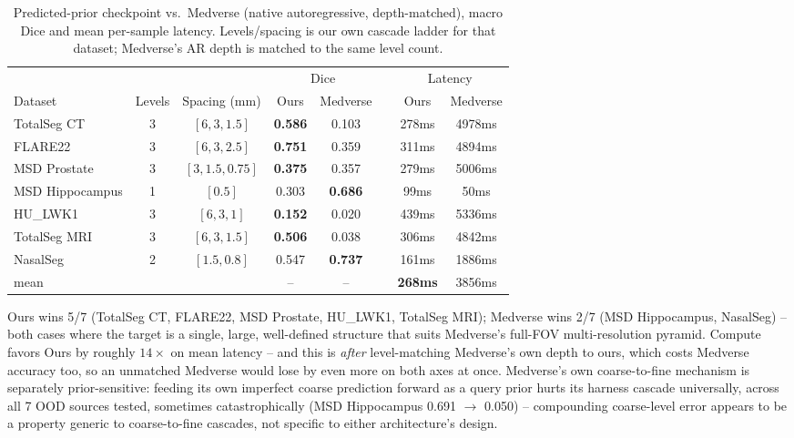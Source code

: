 \begin{table}[t]
  \centering
  \small
  \caption{Predicted-prior checkpoint vs.\ Medverse (native autoregressive,
  depth-matched), macro Dice and mean per-sample latency. Levels/spacing
  is our own cascade ladder for that dataset; Medverse's AR depth is
  matched to the same level count.}
  \label{tab:cascade-medverse}
  \begin{tabular}{lccccccc}
    \toprule
    & & & \multicolumn{2}{c}{Dice} & & \multicolumn{2}{c}{Latency} \\
    \cmidrule(lr){4-5} \cmidrule(lr){7-8}
    Dataset & Levels & Spacing (mm) & Ours & Medverse & & Ours & Medverse \\
    \midrule
    TotalSeg CT & 3 & $[6,3,1.5]$ & \textbf{0.586} & 0.103 & & 278ms & 4978ms \\
    FLARE22 & 3 & $[6,3,2.5]$ & \textbf{0.751} & 0.359 & & 311ms & 4894ms \\
    MSD Prostate & 3 & $[3,1.5,0.75]$ & \textbf{0.375} & 0.357 & & 279ms & 5006ms \\
    MSD Hippocampus & 1 & $[0.5]$ & 0.303 & \textbf{0.686} & & 99ms & 50ms \\
    HU\_LWK1 & 3 & $[6,3,1]$ & \textbf{0.152} & 0.020 & & 439ms & 5336ms \\
    TotalSeg MRI & 3 & $[6,3,1.5]$ & \textbf{0.506} & 0.038 & & 306ms & 4842ms \\
    NasalSeg & 2 & $[1.5,0.8]$ & 0.547 & \textbf{0.737} & & 161ms & 1886ms \\
    \midrule
    mean & & & -- & -- & & \textbf{268ms} & 3856ms \\
    \bottomrule
  \end{tabular}
\end{table}

Ours wins 5/7 (TotalSeg CT, FLARE22, MSD Prostate, HU\_LWK1, TotalSeg
MRI); Medverse wins 2/7 (MSD Hippocampus, NasalSeg) -- both cases where
the target is a single, large, well-defined structure that suits
Medverse's full-FOV multi-resolution pyramid. Compute favors Ours by
roughly $14\times$ on
mean latency -- and this is \emph{after} level-matching Medverse's own
depth to ours, which costs Medverse accuracy too, so an unmatched
Medverse would lose by even more on both axes at once.
Medverse's own coarse-to-fine mechanism is separately prior-sensitive:
feeding its own imperfect coarse prediction forward as a query prior
hurts its harness cascade universally, across all 7 OOD sources tested,
sometimes catastrophically (MSD Hippocampus 0.691 $\to$ 0.050) --
compounding coarse-level error appears to be a property generic to
coarse-to-fine cascades, not specific to either architecture's design.


